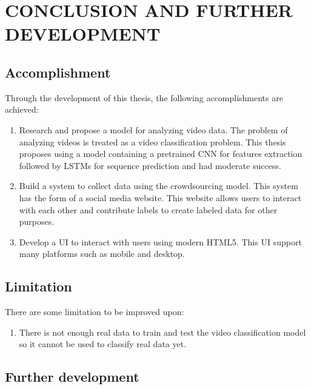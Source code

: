 \chapter{CONCLUSION AND FURTHER DEVELOPMENT}

\section{Accomplishment}
Through the development of this thesis, the following accomplishments are achieved:
\begin{enumerate}
    \item Research and propose a model for analyzing video data. The problem of analyzing videos is treated as a video classification problem. This thesis proposes using a model containing a pretrained CNN for features extraction followed by LSTMs for sequence prediction and had moderate success.
    \item Build a system to collect data using the crowdsourcing model. This system has the form of a social media website. This website allows users to interact with each other and contribute labels to create labeled data for other purposes.
    \item Develop a UI to interact with users using modern HTML5. This UI support many platforms such as mobile and desktop.
\end{enumerate}


\section{Limitation}
There are some limitation to be improved upon:

\begin{enumerate}

\item There is not enough real data to train and test the video classification model so it cannot be used to classify real data yet.
\end{enumerate}

\section{Further development}


